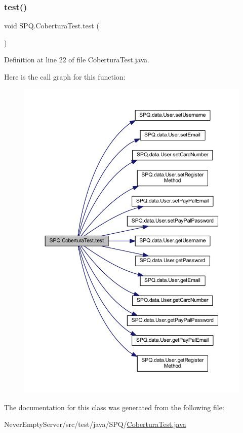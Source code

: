 \subsubsection{\texorpdfstring{test()}{test()}}
{\footnotesize\ttfamily void S\+P\+Q.\+Cobertura\+Test.\+test (\begin{DoxyParamCaption}{ }\end{DoxyParamCaption})}



Definition at line 22 of file Cobertura\+Test.\+java.

Here is the call graph for this function\+:
\nopagebreak
\begin{figure}[H]
\begin{center}
\leavevmode
\includegraphics[width=350pt]{class_s_p_q_1_1_cobertura_test_a638bd1485fb908cc3a97cda6f4d8a857_cgraph}
\end{center}
\end{figure}


The documentation for this class was generated from the following file\+:\begin{DoxyCompactItemize}
\item 
Never\+Empty\+Server/src/test/java/\+S\+P\+Q/\mbox{\hyperlink{_cobertura_test_8java}{Cobertura\+Test.\+java}}\end{DoxyCompactItemize}
